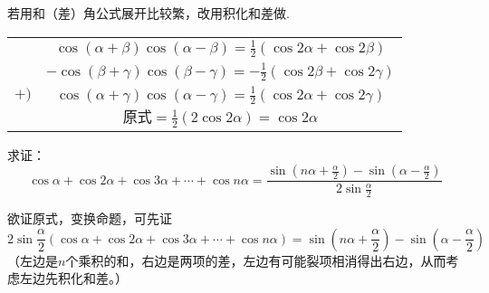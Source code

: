 \begin{analyze}
若用和（差）角公式展开比较繁，改用积化和差做.
\end{analyze}

\begin{solution}
\begin{center}
\begin{tabular}{cc}
& $\cos(\alpha+\beta)\cos(\alpha-\beta) = \frac{1}{2}(\cos2\alpha+\cos2\beta)$\\[1.5ex]
&$-\cos(\beta+\gamma)\cos(\beta-\gamma)= -\frac{1}{2}(\cos2\beta+\cos2\gamma)$\\[1.5ex]
$+)$&$\cos(\alpha+\gamma)\cos(\alpha-\gamma)= \frac{1}{2}(\cos2\alpha+\cos2\gamma)$\\[1.5ex]
\hline
&$\text{原式}=\frac{1}{2}(2\cos2\alpha)=\cos2\alpha$\\[1.5ex]
\end{tabular}
\end{center}
\end{solution}


\begin{example}
求证：
\[\cos\alpha+\cos2\alpha+\cos3\alpha+\cdots+\cos n\alpha=\frac{\sin\left(n\alpha+\frac{\alpha}{2}\right)-\sin\left(\alpha-\frac{\alpha}{2}\right)}{2\sin\frac{\alpha}{2}}\]
\end{example}

\begin{analyze}
欲证原式，变换命题，可先证
\begin{equation}
2\sin\frac{\alpha}{2}(\cos\alpha+\cos2\alpha+\cos3\alpha+\cdots+\cos n\alpha)=\sin\left(n\alpha+\frac{\alpha}{2}\right)-\sin\left(\alpha-\frac{\alpha}{2}\right)\tag{*}
\end{equation}
（左边是$n$个乘积的和，右边是两项的差，左边有可能裂项相消得出右边，从而考虑左边先积化和差。）
\end{analyze}

